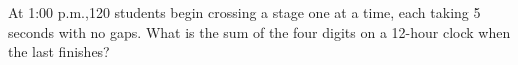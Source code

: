 At 1:00 p.m.,120 students begin crossing a stage one at a time, each taking 5 seconds with no gaps. What is the sum of the four digits on a 12-hour clock when the last finishes?

